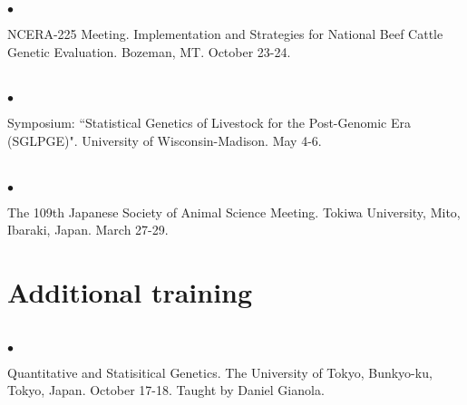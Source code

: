 \documentclass[margin,line,10pt]{res}
\newenvironment{list2}{
  \begin{list}{$\bullet$}{%
      \setlength{\itemsep}{0in}
      \setlength{\parsep}{0in} \setlength{\parskip}{0in}
      \setlength{\topsep}{0in} \setlength{\partopsep}{0in} 
      \setlength{\leftmargin}{0.2in}}}{\end{list}}
\begin{document}
\begin{resume}
\begin{list2}
\vspace{0.5cm}

\item NCERA-225 Meeting. Implementation and Strategies for National Beef Cattle Genetic Evaluation. Bozeman, MT. October 23-24. 

\end{list2}  




\section{}
\begin{list2}
\item Symposium: ``Statistical Genetics of Livestock for the Post-Genomic Era (SGLPGE)". University of Wisconsin-Madison. May 4-6. 
\end{list2}  

\section{}
\begin{list2}
\item  The 109th Japanese Society of Animal Science Meeting. Tokiwa University, Mito, Ibaraki, Japan. March 27-29. 

\end{list2}













\vspace{0.5cm}
\section{ \sc Additional training}
\vspace{1cm}

\section{}
\begin{list2}

\item Quantitative and Statisitical Genetics. The University of Tokyo, Bunkyo-ku, Tokyo, Japan. October 17-18. Taught by Daniel Gianola.

  \vspace{0.5cm}
  

\end{list2}
\end{resume}
\end{document}
